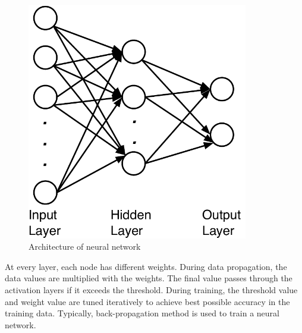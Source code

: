 \begin{figure}[h]
\centering
\includegraphics[width=3.8in]{figures/nn.pdf}
\caption{Architecture of neural network}
\label{f:nn_archi}
\end{figure}

At every layer, each node has different weights.
During data propagation, the data values are multiplied with the weights.
The final value passes through the activation layers if it exceeds the threshold.
During training, the threshold value and weight value are tuned iteratively to achieve best possible accuracy in the training data. 
Typically, back-propagation method is used to train a neural network.











